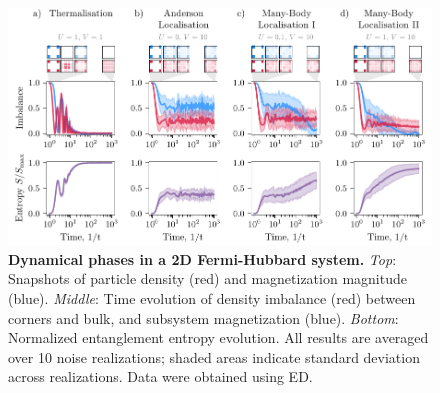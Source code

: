 \begin{figure}[h]
    \centering
    \includegraphics{fig-ai/loc-therm.pdf}
    \caption{
        \textbf{Dynamical phases in a 2D Fermi-Hubbard system.} 
        \textit{Top}: Snapshots of particle density (red) and magnetization magnitude (blue). 
        \textit{Middle}: Time evolution of density imbalance (red) between corners and bulk, and subsystem magnetization (blue). 
        \textit{Bottom}: Normalized entanglement entropy evolution. 
        All results are averaged over 10 noise realizations; shaded areas indicate standard deviation across realizations.
        Data were obtained using ED.
    }
    \label{fig:loctherm}
\end{figure}

 

\newpage




